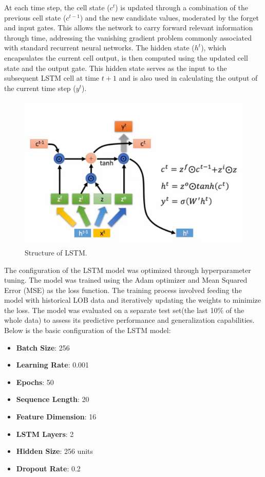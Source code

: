 \documentclass[conference]{IEEEtran}
\begin{document}
At each time step, the cell state (\( c^t \)) is updated through a combination of the previous cell state (\( c^{t-1} \)) and the new candidate values, moderated by the forget and input gates. This allows the network to carry forward relevant information through time, addressing the vanishing gradient problem commonly associated with standard recurrent neural networks. The hidden state (\( h^t \)), which encapsulates the current cell output, is then computed using the updated cell state and the output gate. This hidden state serves as the input to the subsequent LSTM cell at time \( t+1 \) and is also used in calculating the output of the current time step (\( y^t \)).


\begin{figure}[!ht]
\begin{center}
\includegraphics[width=\linewidth]{./img/lstm_structure.png} 
\caption{Structure of LSTM.}
\label{fig.1}
\end{center}
\end{figure}

The configuration of the LSTM model was optimized through hyperparameter tuning.
The model was trained using the Adam optimizer and Mean Squared Error (MSE) as the loss function.
The training process involved feeding the model with historical LOB data and iteratively updating the weights to minimize the loss.
The model was evaluated on a separate test set(the last 10\% of the whole data) to assess its predictive performance and generalization capabilities.
Below is the basic configuration of the LSTM model:
\begin{itemize}
    \item \textbf{Batch Size}: 256
    \item \textbf{Learning Rate}: 0.001
    \item \textbf{Epochs}: 50
    \item \textbf{Sequence Length}: 20
    \item \textbf{Feature Dimension}: 16
    \item \textbf{LSTM Layers}: 2
    \item \textbf{Hidden Size}: 256 units
    \item \textbf{Dropout Rate}: 0.2
\end{itemize}
\end{document}
